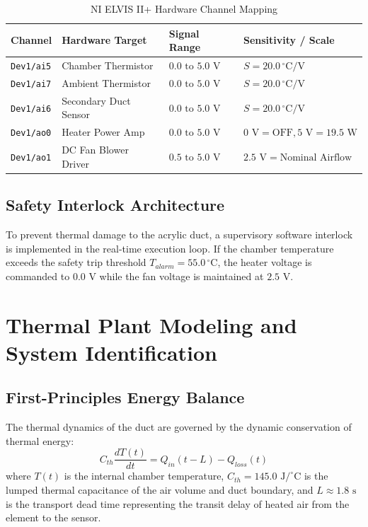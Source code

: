 \documentclass[conference]{IEEEtran}
\begin{document}
\begin{table}[htbp]
\caption{NI ELVIS II+ Hardware Channel Mapping}
\label{tab:pinout}
\centering
\begin{tabular}{@{}llll@{}}
\toprule
\textbf{Channel} & \textbf{Hardware Target} & \textbf{Signal Range} & \textbf{Sensitivity / Scale} \\ \midrule
\texttt{Dev1/ai5} & Chamber Thermistor & $0.0\text{ to }5.0\text{ V}$ & $S = 20.0\,^\circ\text{C/V}$ \\
\texttt{Dev1/ai7} & Ambient Thermistor & $0.0\text{ to }5.0\text{ V}$ & $S = 20.0\,^\circ\text{C/V}$ \\
\texttt{Dev1/ai6} & Secondary Duct Sensor & $0.0\text{ to }5.0\text{ V}$ & $S = 20.0\,^\circ\text{C/V}$ \\
\texttt{Dev1/ao0} & Heater Power Amp & $0.0\text{ to }5.0\text{ V}$ & $0\text{ V}=\text{OFF}, 5\text{ V}=19.5\text{ W}$ \\
\texttt{Dev1/ao1} & DC Fan Blower Driver & $0.5\text{ to }5.0\text{ V}$ & $2.5\text{ V}=\text{Nominal Airflow}$ \\ \bottomrule
\end{tabular}
\end{table}

\subsection{Safety Interlock Architecture}
To prevent thermal damage to the acrylic duct, a supervisory software interlock is implemented in the real-time execution loop. If the chamber temperature exceeds the safety trip threshold $T_{alarm} = 55.0\,^\circ\text{C}$, the heater voltage is commanded to $0.0\text{ V}$ while the fan voltage is maintained at $2.5\text{ V}$.

\section{Thermal Plant Modeling and System Identification}

\subsection{First-Principles Energy Balance}
The thermal dynamics of the duct are governed by the dynamic conservation of thermal energy:
\begin{equation}
C_{th} \frac{dT(t)}{dt} = Q_{in}(t - L) - Q_{loss}(t)
\label{eq:energy_balance}
\end{equation}
where $T(t)$ is the internal chamber temperature, $C_{th} = 145.0\text{ J/}^\circ\text{C}$ is the lumped thermal capacitance of the air volume and duct boundary, and $L \approx 1.8\text{ s}$ is the transport dead time representing the transit delay of heated air from the element to the sensor.
\end{document}
